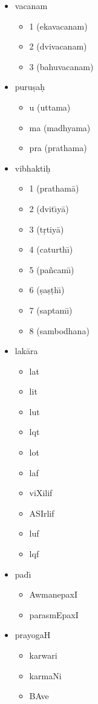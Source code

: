 \documentclass{llncs}
\begin{document}
\begin{itemize}
\item vacanam
\begin{itemize}
\item 1 (ekavacanam)
\item 2 (dvivacanam)
\item 3 (bahuvacanam)
\end{itemize}

\item puru\d{s}a\d{h}
\begin{itemize}
\item u (uttama)
\item ma (madhyama)
\item pra (prathama)
\end{itemize}

\item vibhakti\d{h}
\begin{itemize}
\item 1 (pratham{\=a})
\item 2 (dvit{\=\i}y{\=a})
\item 3 (t\d{r}tiy{\=a})
\item 4 (caturth{\=\i})
\item 5 (pa\~ncam{\=\i})
\item 6 (\d{s}a\d{s}\d{t}h{\=\i})
\item 7 (saptam{\=\i})
\item 8 (sambodhana)
\end{itemize}

\item lak{\=a}ra
\begin{itemize}
\item lat
\item lit 
\item lut
\item lqt
\item lot
\item laf
\item viXilif
\item ASIrlif
\item luf
\item lqf
\end{itemize}

\item pad{\=\i}
\begin{itemize}
\item AwmanepaxI
\item parasmEpaxI
\end{itemize}

\item prayogaH
\begin{itemize}
\item karwari
\item karmaNi
\item BAve
\end{itemize}


\end{itemize}
\end{document}
